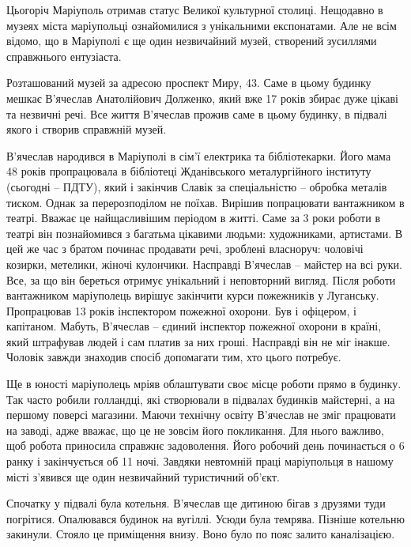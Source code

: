 \raggedcolumns
\begin{multicols}{2} %
\setlength{\parindent}{0pt}

Цьогоріч Маріуполь отримав статус Великої культурної столиці. Нещодавно в
музеях міста маріупольці ознайомилися з унікальними  експонатами. Але не всім
відомо, що в Маріуполі є ще один незвичайний музей, створений зусиллями
справжнього ентузіаста.

Розташований музей за адресою проспект Миру, 43. Саме в цьому будинку мешкає
В’ячеслав Анатолійович Долженко, який вже 17 років збирає дуже цікаві та
незвичні речі. Все життя В'ячеслав прожив саме в цьому будинку, в підвалі якого
і створив справжній музей.

В'ячеслав народився в Маріуполі в сім'ї електрика та бібліотекарки. Його мама
48 років пропрацювала в бібліотеці Жданівського металургійного інституту
(сьогодні – ПДТУ), який і закінчив Славік за спеціальністю – обробка металів
тиском. Однак за перерозподілом не поїхав. Вирішив попрацювати вантажником в
театрі. Вважає це найщасливішим періодом в житті. Саме за 3 роки роботи в
театрі він познайомився з багатьма цікавими людьми: художниками, артистами. В
цей же час з братом починає продавати речі, зроблені власноруч: чоловічі
козирки, метелики, жіночі кулончики. Насправді В'ячеслав – майстер на всі руки.
Все, за що він береться отримує унікальний і неповторний вигляд. Після роботи
вантажником маріуполець вирішує закінчити курси пожежників у Луганську.
Пропрацював 13 років інспектором пожежної охорони. Був і офіцером, і капітаном.
Мабуть, В'ячеслав – єдиний інспектор пожежної охорони в країні, який штрафував
людей і сам платив за них гроші. Насправді він не міг інакше. Чоловік завжди
знаходив спосіб допомагати тим, хто цього потребує.

Ще в юності маріуполець мріяв облаштувати своє місце роботи прямо в будинку.
Так часто робили голландці, які створювали в підвалах будинків майстерні, а на
першому поверсі магазини. Маючи технічну освіту В'ячеслав не зміг працювати на
заводі, адже вважає, що це не зовсім його покликання. Для нього важливо, щоб
робота приносила справжнє задоволення. Його робочий день починається о 6 ранку
і закінчується об 11 ночі. Завдяки невтомній праці маріупольця в нашому місті
з'явився ще один незвичайний туристичний об'єкт.

Спочатку у підвалі була котельня. В'ячеслав ще дитиною бігав з друзями туди
погрітися. Опалювався будинок на вугіллі. Усюди була темрява. Пізніше котельню
закинули. Стояло це приміщення внизу. Воно було по пояс залито каналізацією. 


\end{multicols}

